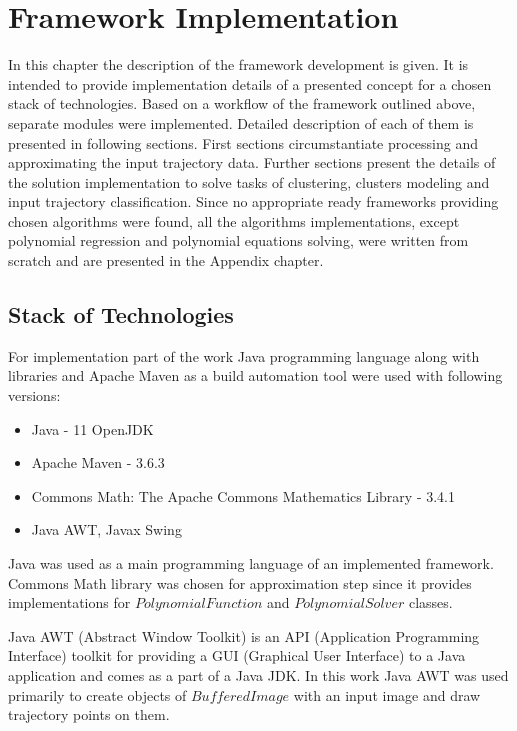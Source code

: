 \chapter{Framework Implementation}

In this chapter the description of the framework development is given. It is intended to provide implementation details of a presented concept for a chosen stack of technologies. Based on a workflow of the framework outlined above, separate modules were implemented. Detailed description of each of them is presented in following sections. First sections circumstantiate processing and approximating the input trajectory data. Further sections present the details of the solution implementation to solve tasks of clustering, clusters modeling and input trajectory classification. Since no appropriate ready frameworks providing chosen algorithms were found, all the algorithms implementations, except polynomial regression and polynomial equations solving, were written from scratch and are presented in the Appendix chapter.

\section{Stack of Technologies}

For implementation part of the work Java programming language along with libraries and Apache Maven as a build automation tool were used with following versions:

\begin{itemize}
	\setlength\itemsep{0em}
	\item Java - 11 OpenJDK
	\item Apache Maven - 3.6.3
	\item Commons Math: The Apache Commons Mathematics Library - 3.4.1
	\item Java AWT, Javax Swing 
\end{itemize}

Java was used as a main programming language of an implemented framework. Commons Math library was chosen for approximation step since it provides implementations for $PolynomialFunction$ and $PolynomialSolver$ classes. 

Java AWT (Abstract Window Toolkit) is an API (Application Programming Interface) toolkit for providing a GUI (Graphical User Interface) to a Java application and comes as a part of a Java JDK. In this work Java AWT was used primarily to create objects of $BufferedImage$ with an input image and draw trajectory points on them.

